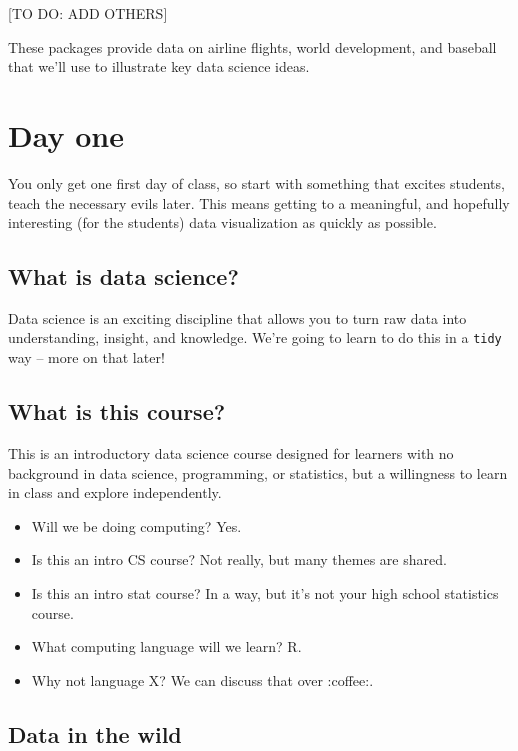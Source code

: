 \documentclass[]{book}
\providecommand{\tightlist}{%
  \setlength{\itemsep}{0pt}\setlength{\parskip}{0pt}}
\theoremstyle{definition}
\theoremstyle{definition}
\theoremstyle{definition}
\theoremstyle{remark}
\begin{document}
{[}TO DO: ADD OTHERS{]}

These packages provide data on airline flights, world development, and
baseball that we'll use to illustrate key data science ideas.

\chapter{Day one}\label{dayone}

You only get one first day of class, so start with something that
excites students, teach the necessary evils later. This means getting to
a meaningful, and hopefully interesting (for the students) data
visualization as quickly as possible.

\section{What is data science?}\label{what-is-data-science}

Data science is an exciting discipline that allows you to turn raw data
into understanding, insight, and knowledge. We're going to learn to do
this in a \texttt{tidy} way -- more on that later!

\section{What is this course?}\label{what-is-this-course}

This is an introductory data science course designed for learners with
no background in data science, programming, or statistics, but a
willingness to learn in class and explore independently.

\begin{itemize}
\tightlist
\item
  Will we be doing computing? Yes.
\item
  Is this an intro CS course? Not really, but many themes are shared.
\item
  Is this an intro stat course? In a way, but it's not your high school
  statistics course.
\item
  What computing language will we learn? R.
\item
  Why not language X? We can discuss that over :coffee:.
\end{itemize}

\section{Data in the wild}\label{data-in-the-wild}
\end{document}
